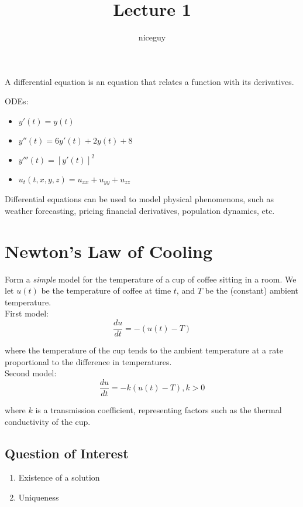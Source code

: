 \documentclass[12pt]{article}
\title{Lecture 1}
\author{niceguy}
\begin{document}
\maketitle

\begin{defn}
 A differential equation is an equation that relates a function with its derivatives.
\end{defn}

\begin{ex}
 ODEs:
 
\begin{itemize}
 \item $y'(t) = y(t)$ \\
 \item $y''(t) = 6y'(t) + 2y(t) + 8$ \\
 \item $y'''(t) = [y'(t)]^2$ \\
\end{itemize}

\begin{itemize}
 \item $u_t(t,x,y,z) = u_{xx} + u_{yy} + u_{zz}$ \\
\end{itemize}
\end{ex}

Differential equations can be used to model physical phenomenons, such as weather forecasting, pricing financial derivatives, population dynamics, etc.

\section{Newton's Law of Cooling}

Form a \textit{simple} model for the temperature of a cup of coffee sitting in a room. We let $u(t)$ be the temperature of coffee at time $t$, and $T$ be the (constant) ambient temperature. \\
First model:
$$\frac{du}{dt} = -(u(t) - T)$$

where the temperature of the cup tends to the ambient temperature at a rate proportional to the difference in temperatures. \\
Second model:
$$\frac{du}{dt} = -k(u(t) - T), k > 0$$

where $k$ is a transmission coefficient, representing factors such as the thermal conductivity of the cup. \\

\subsection{Question of Interest}
\begin{enumerate}
 \item Existence of a solution \\
 \item Uniqueness \\
\end{enumerate}
\end{document}

